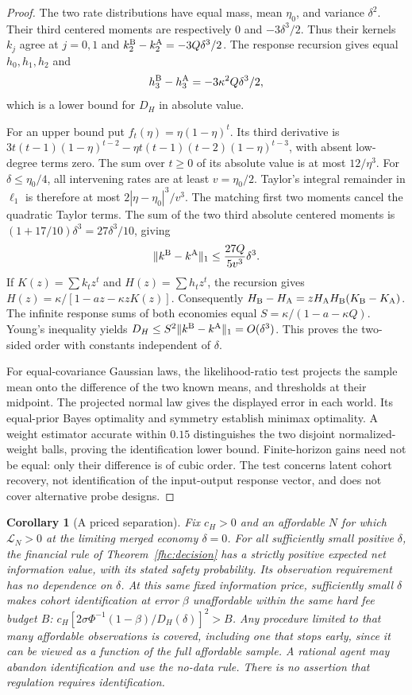 \documentclass[12pt]{article}
\newtheorem{corollary}[theorem]{Corollary}
\theoremstyle{definition}
\theoremstyle{remark}
\begin{document}
\begin{proof}
The two rate distributions have equal mass, mean $\eta_0$, and variance
$\delta^2$. Their third centered moments are respectively $0$ and
$-3\delta^3/2$. Thus their kernels $k_j$ agree at $j=0,1$ and
$k^{\rm B}_2-k^{\rm A}_2=-3Q\delta^3/2$. The response recursion
gives equal $h_0,h_1,h_2$ and
\[
 h^{\rm B}_3-h^{\rm A}_3=-3\kappa^2Q\delta^3/2,
\]
which is a lower bound for $D_H$ in absolute value.

For an upper bound put $f_t(\eta)=\eta(1-\eta)^t$.
Its third derivative is
$3t(t-1)(1-\eta)^{t-2}
-\eta t(t-1)(t-2)(1-\eta)^{t-3}$, with absent low-degree terms zero.
The sum over $t\ge0$ of its absolute value is at most $12/\eta^3$.
For $\delta\le\eta_0/4$, all intervening rates are at least
$v=\eta_0/2$. Taylor's integral remainder in $\ell_1$ is therefore at
most $2|\eta-\eta_0|^3/v^3$. The matching first two moments cancel
the quadratic Taylor terms. The sum of the two third absolute centered
moments is $(1+17/10)\delta^3=27\delta^3/10$, giving
\[
 \|k^{\rm B}-k^{\rm A}\|_1\le\frac{27Q}{5v^3}\delta^3.
\]
If $K(z)=\sum k_tz^t$ and $H(z)=\sum h_tz^t$, the recursion gives
$H(z)=\kappa/[1-az-\kappa zK(z)]$. Consequently
$H_{\rm B}-H_{\rm A}=zH_{\rm A}H_{\rm B}(K_{\rm B}-K_{\rm A})$.
The infinite response sums of both economies equal
$S=\kappa/(1-a-\kappa Q)$. Young's inequality yields
$D_H\le S^2\|k^{\rm B}-k^{\rm A}\|_1=O(\delta^3)$.
This proves the two-sided order with constants independent of $\delta$.

For equal-covariance Gaussian laws, the likelihood-ratio test projects the
sample mean onto the difference of the two known means, and thresholds at
their midpoint. The projected normal law gives the displayed error in each
world. Its equal-prior Bayes optimality and symmetry establish minimax
optimality. A weight estimator accurate within $0.15$ distinguishes the
two disjoint normalized-weight balls, proving the identification lower bound.
Finite-horizon gains need not be equal: only their difference is of cubic
order. The test concerns latent cohort recovery, not identification of the
input-output response vector, and does not cover alternative probe designs.
\end{proof}

\begin{corollary}[A priced separation]\label{fhc:priced}
Fix $c_H>0$ and an affordable $N$ for which $\mathcal L_N>0$ at the limiting merged
economy $\delta=0$. For all sufficiently small positive $\delta$, the
financial rule of Theorem~\ref{fhc:decision} has a
strictly positive expected net information value, with its stated safety
probability. Its observation requirement has no dependence on $\delta$.
At this same fixed information price, sufficiently small $\delta$ makes cohort
identification at error $\beta$ unaffordable within the same hard fee budget
$B$: $c_H[2\sigma\Phi^{-1}(1-\beta)/D_H(\delta)]^2>B$.
Any procedure limited to that many affordable observations is covered,
including one that stops early, since it can be viewed as a function of the
full affordable sample. A rational agent may abandon identification and use
the no-data rule. There is no assertion that regulation requires identification.
\end{corollary}
\end{document}
